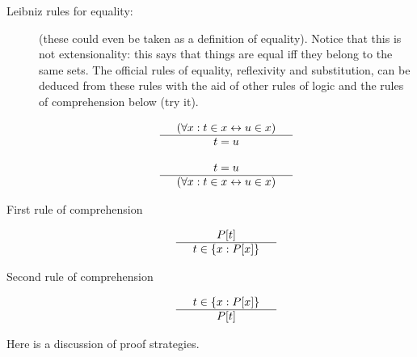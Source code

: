 \documentclass[12pt]{book}
\begin{document}
\begin{description}
\item[Leibniz rules for equality:] (these could even be taken as a definition of equality).  Notice that this is not extensionality:  this says that things are equal iff they belong to the same sets.  The official rules of equality, reflexivity and substitution, can be deduced from these rules with the aid of other rules of logic and the rules of comprehension below (try it).

$$\begin{array}{ccc}

  & (\forall x: t \in x \leftrightarrow u \in x )&  \\ \hline

  & t=u &  \end{array}$$

$$\begin{array}{ccc}

  & t=u &  \\ \hline

  & (\forall x:t \in x \leftrightarrow u \in x)&  \end{array}$$


\item[First rule of comprehension]

$$\begin{array}{ccc}

  & P[t] &  \\ \hline

  & t \in \{x:P[x]\} &  \end{array}$$

\item[Second rule of comprehension]

$$\begin{array}{ccc}

  & t \in \{x:P[x]\}  &  \\ \hline

  & P[t]  &  \end{array}$$

\end{description}


Here is a discussion of proof strategies.
\end{document}
